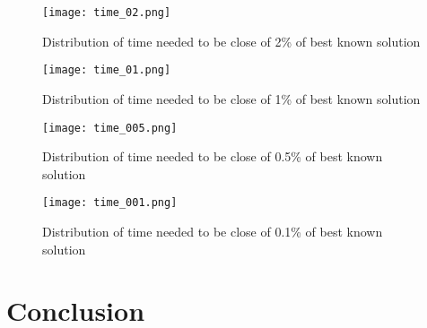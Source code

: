 \documentclass[a4paper,10pt]{article}
\begin{document}
	\begin{figure}[H]
		\centering
		\caption{Distribution of time needed to be close of 2\% of best known solution}
		\texttt{[image: time\_02.png]}
	\end{figure}

	\begin{figure}[H]
		\centering
		\caption{Distribution of time needed to be close of 1\% of best known solution}
		\texttt{[image: time\_01.png]}
	\end{figure}

	\begin{figure}[H]
		\centering
		\caption{Distribution of time needed to be close of 0.5\% of best known solution}
		\texttt{[image: time\_005.png]}
	\end{figure}

	\begin{figure}[H]
		\centering
		\caption{Distribution of time needed to be close of 0.1\% of best known solution}
		\texttt{[image: time\_001.png]}
	\end{figure}


\section{Conclusion}




\end{document}
